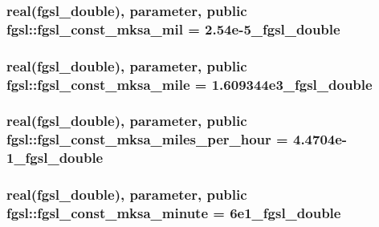 \hypertarget{classfgsl_af6a9d8baf161c3f9b2b9c8ef41833a67}{
\subsubsection[{fgsl\-\_\-const\-\_\-mksa\-\_\-mil}]{\setlength{\rightskip}{0pt plus 5cm}real({\bf fgsl\-\_\-double}), parameter, public fgsl\-::fgsl\-\_\-const\-\_\-mksa\-\_\-mil = 2.\-54e-\/5\-\_\-fgsl\-\_\-double}}\label{classfgsl_af6a9d8baf161c3f9b2b9c8ef41833a67}
\hypertarget{classfgsl_a6336ad4316ac012f6ae1ba2c951ec520}{
\subsubsection[{fgsl\-\_\-const\-\_\-mksa\-\_\-mile}]{\setlength{\rightskip}{0pt plus 5cm}real({\bf fgsl\-\_\-double}), parameter, public fgsl\-::fgsl\-\_\-const\-\_\-mksa\-\_\-mile = 1.\-609344e3\-\_\-fgsl\-\_\-double}}\label{classfgsl_a6336ad4316ac012f6ae1ba2c951ec520}
\hypertarget{classfgsl_a66a4e29fec2be328384363b6a5b3efcd}{
\subsubsection[{fgsl\-\_\-const\-\_\-mksa\-\_\-miles\-\_\-per\-\_\-hour}]{\setlength{\rightskip}{0pt plus 5cm}real({\bf fgsl\-\_\-double}), parameter, public fgsl\-::fgsl\-\_\-const\-\_\-mksa\-\_\-miles\-\_\-per\-\_\-hour = 4.\-4704e-\/1\-\_\-fgsl\-\_\-double}}\label{classfgsl_a66a4e29fec2be328384363b6a5b3efcd}
\hypertarget{classfgsl_a5c0cc4ab0dc2be570d83ef0f9d2f4ba6}{
\subsubsection[{fgsl\-\_\-const\-\_\-mksa\-\_\-minute}]{\setlength{\rightskip}{0pt plus 5cm}real({\bf fgsl\-\_\-double}), parameter, public fgsl\-::fgsl\-\_\-const\-\_\-mksa\-\_\-minute = 6e1\-\_\-fgsl\-\_\-double}}\label{classfgsl_a5c0cc4ab0dc2be570d83ef0f9d2f4ba6}
